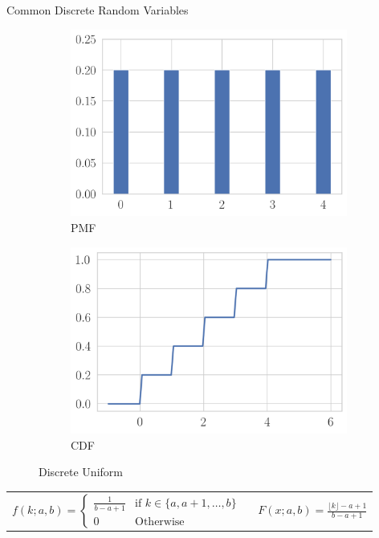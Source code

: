 \documentclass[11pt, xcolor={dvipsnames}, hyperref={colorlinks, allcolors=Blue}]{beamer}
\begin{document}
\begin{frame}{Common Discrete Random Variables}

\begin{figure}[t]
	\begin{subfigure}[b]{0.4\textwidth}
		\centering
		\includegraphics[width=\textwidth]{discrete_uniform_pmf.png}
		\caption*{PMF}
	\end{subfigure}
	\begin{subfigure}[b]{0.4\textwidth}
		\centering
		\includegraphics[width=\textwidth]{discrete_uniform_cdf.png}
		\caption*{CDF}
	\end{subfigure}
\caption{Discrete Uniform}
\end{figure}

\begin{center}
\begin{tabular}{cc}
$f(k; a, b) = \begin{cases} \frac{1}{b-a+1} & \text{if } k\in\{a, a+1, \dots, b\} \\ 0 & \text{Otherwise} \end{cases}$ & \ 
$F(x; a, b) = \frac{\lfloor k \rfloor - a + 1}{b-a+1}$
\end{tabular}
\end{center}

\end{frame}
\end{document}
